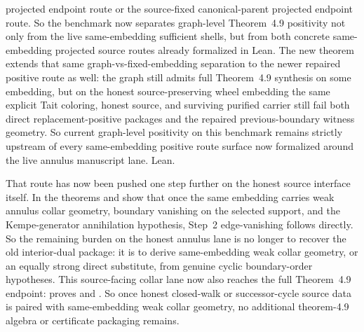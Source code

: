 \documentclass[11pt]{article}
\begin{document}
projected endpoint route or the source-fixed canonical-parent projected
endpoint route.  So the benchmark now separates graph-level Theorem~4.9
positivity not only from the live same-embedding sufficient shells, but from
both concrete same-embedding projected source routes already formalized in
Lean.  The new theorem
extends that same graph-vs-fixed-embedding separation to the newer repaired
positive route as well: the graph still admits full Theorem~4.9 synthesis on
some embedding, but on the honest source-preserving wheel embedding the same
explicit Tait coloring, honest source, and surviving purified carrier still
fail both direct replacement-positive packages and the repaired
previous-boundary witness geometry.  So current graph-level positivity on
this benchmark remains strictly upstream of every same-embedding positive
route surface now formalized around the live annulus manuscript lane.
Lean.

That route has now been pushed one step further on the honest source
interface itself.  In
 the theorems
and
show that once the same embedding carries weak annulus collar geometry,
boundary vanishing on the selected support, and the Kempe-generator
annihilation hypothesis, Step~2 edge-vanishing follows directly.  So the
remaining burden on the honest annulus lane is no longer to recover the old
interior-dual package: it is to derive same-embedding weak collar geometry,
or an equally strong direct substitute, from genuine cyclic boundary-order
hypotheses.  This source-facing collar lane now also reaches the full
Theorem~4.9 endpoint:  proves
and
.
So once honest closed-walk or successor-cycle source data is paired with
same-embedding weak collar geometry, no additional theorem-4.9 algebra or
certificate packaging remains.
\end{document}
